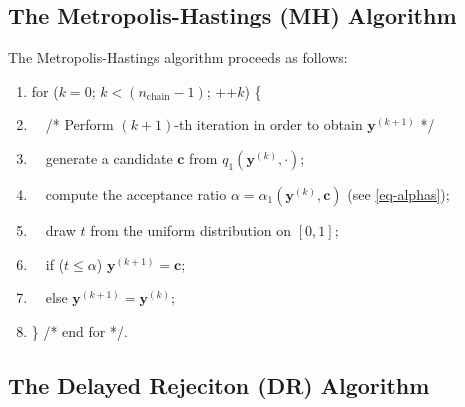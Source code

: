 \subsection{The Metropolis-Hastings (MH) Algorithm}%

The Metropolis-Hastings algorithm proceeds as follows:
\begin{enumerate}
\item for ($k=0$; $k < (n_{\mbox{chain}}-1)$; ++$k$) \{
\item $\quad$/* Perform $(k+1)$-th iteration in order to obtain $\mathbf{y}^{(k+1)}$ */
\item $\quad$generate a candidate $\mathbf{c}$ from $q_1(\mathbf{y}^{(k)},\cdot)$;
\item $\quad$compute the acceptance ratio $\alpha=\alpha_1(\mathbf{y}^{(k)},\mathbf{c})$ (see \eqref{eq-alphas});
\item $\quad$draw $t$ from the uniform distribution on $[0,1]$;
\item $\quad$if ($t\leqslant \alpha$) $\mathbf{y}^{(k+1)}=\mathbf{c}$;
\item $\quad$else $\mathbf{y}^{(k+1)}=\mathbf{y}^{(k)}$;
\item \} /* end for */.
\end{enumerate}

\subsection{The Delayed Rejeciton (DR) Algorithm}%

